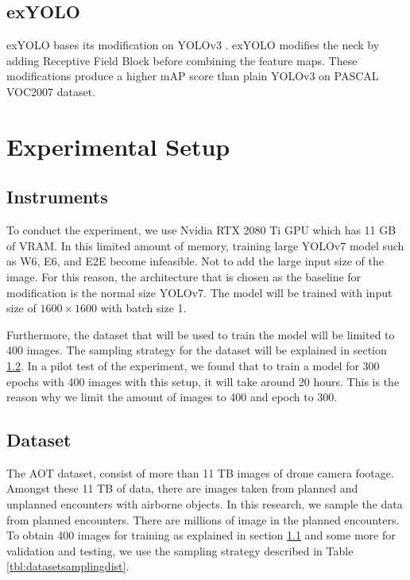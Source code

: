 \documentclass[conference]{IEEEtran}
\begin{document}
\subsection{exYOLO}
exYOLO bases its modification on YOLOv3 \cite{exyolo}. exYOLO modifies
the neck by adding Receptive Field Block before combining the feature maps.
These modifications produce a higher mAP score than plain YOLOv3 on
PASCAL VOC2007 dataset.

\section{Experimental Setup}

\subsection{Instruments}
\label{section:instruments}
To conduct the experiment, we use Nvidia RTX 2080 Ti GPU which has 11 GB of VRAM.
In this limited amount of memory, training large YOLOv7 model such as W6, E6, and E2E
become infeasible. Not to add the large input size of the image. For this reason,
the architecture that is chosen as the baseline for modification is the normal  size
YOLOv7. The model will be trained with input size of $1600\times1600$ with batch size 1.

Furthermore, the dataset that will be used to train the model will be limited to 400 images.
The sampling strategy for the dataset will be explained in section \ref{section:dataset}.
In a pilot test of the experiment, we found that to train a model for 300 epochs with 400 images
with this setup, it will take around 20 hours. This is the reason why we limit the 
amount of images to 400 and epoch to 300.

\subsection{Dataset}
\label{section:dataset}
The AOT dataset, consist of more than 11 TB images of drone camera footage.
Amongst these 11 TB of data, there are images taken from planned and unplanned encounters with
airborne objects. In this research, we sample the data from planned encounters.
There are millions of image in the planned encounters. To obtain 400 images
for training as explained in section \ref{section:instruments}
and some more for validation and testing, we use the sampling strategy
described in Table \ref{tbl:datasetsamplingdist}.
\end{document}
